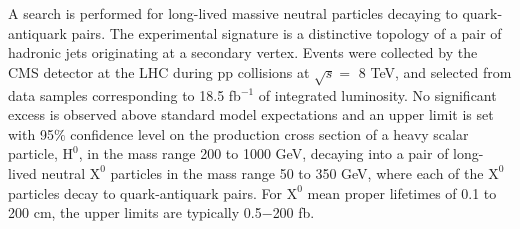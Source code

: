 A search is performed for long-lived massive neutral particles decaying
 to quark-antiquark pairs. The experimental signature is a distinctive topology of a pair of
 hadronic jets originating at a
 secondary vertex.
 Events were collected by the CMS detector at the LHC during pp collisions at $\sqrt{s}=$ 8 TeV, and selected from data samples corresponding to 18.5 fb$^{-1}$ of integrated luminosity. No significant excess
 is observed above standard model expectations and an upper limit is set with 95$\%$ confidence level
 on the production cross section of a heavy scalar particle,
  $\text{H}^0$, in the mass range 200 to 1000 GeV, decaying into a pair of long-lived neutral $\text{X}^0$
   particles in the mass
   range 50 to 350 GeV, where each of the $\text{X}^0$ particles decay to quark-antiquark pairs. For $\text{X}^0$ mean proper lifetimes
   of 0.1 to 200 cm,
    the upper limits are typically 0.5$-$200 fb.
